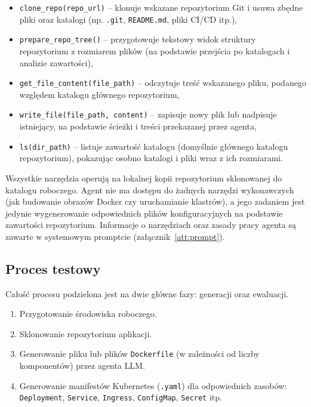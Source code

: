 \begin{itemize}
    \item \texttt{clone\_repo(repo\_url)} – klonuje wskazane repozytorium Git i usuwa zbędne pliki oraz katalogi (np. \texttt{.git}, \texttt{README.md}, pliki CI/CD itp.),
    
    \item \texttt{prepare\_repo\_tree()} – przygotowuje tekstowy widok struktury repozytorium z rozmiarem plików (na podstawie przejścia po katalogach i analizie zawartości),
    
    \item \texttt{get\_file\_content(file\_path)} – odczytuje treść wskazanego pliku, podanego względem katalogu głównego repozytorium,
    
    \item \texttt{write\_file(file\_path, content)} – zapisuje nowy plik lub nadpisuje istniejący, na podstawie ścieżki i treści przekazanej przez agenta,
    
    \item \texttt{ls(dir\_path)} – listuje zawartość katalogu (domyślnie głównego katalogu repozytorium), pokazując osobno katalogi i pliki wraz z ich rozmiarami.
\end{itemize}

Wszystkie narzędzia operują na lokalnej kopii repozytorium sklonowanej do katalogu roboczego. Agent nie ma dostępu do żadnych narzędzi wykonawczych (jak budowanie obrazów Docker czy uruchamianie klastrów), a jego zadaniem jest jedynie wygenerowanie odpowiednich plików konfiguracyjnych na podstawie zawartości repozytorium. Informacje o narzędziach oraz zasady pracy agenta są zawarte w systemowym promptcie (załącznik~\ref{att:prompt}).

\bigskip
\noindent

\subsection{Proces testowy}

Całość procesu podzielona jest na dwie główne fazy: generacji oraz ewaluacji.  

\begin{enumerate}
    \item Przygotowanie środowiska roboczego.
    \item Sklonowanie repozytorium aplikacji.
    \item Generowanie pliku lub plików \texttt{Dockerfile} (w zależności od liczby komponentów) przez agenta LLM.
    \item Generowanie manifestów Kubernetes (\texttt{.yaml}) dla odpowiednich zasobów: \texttt{Deployment}, \texttt{Service}, \texttt{Ingress}, \texttt{ConfigMap}, \texttt{Secret} itp.
\end{enumerate}


